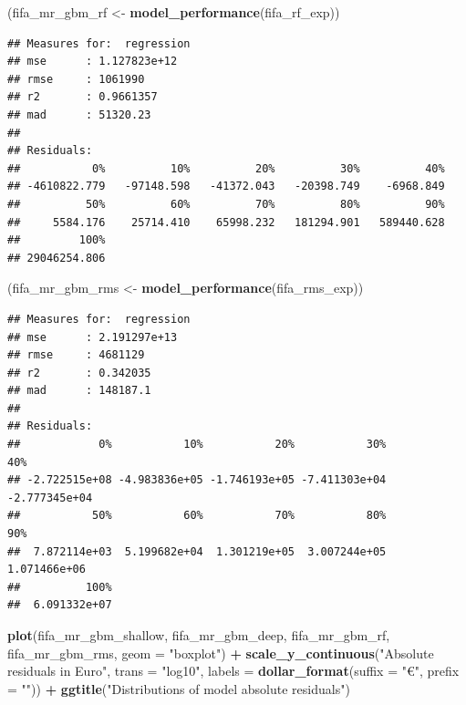 \documentclass[]{krantz}
\newenvironment{Shaded}{\begin{snugshade}}{\end{snugshade}}
\newcommand{\DataTypeTok}[1]{\textcolor[rgb]{0.13,0.29,0.53}{#1}}
\newcommand{\KeywordTok}[1]{\textcolor[rgb]{0.13,0.29,0.53}{\textbf{#1}}}
\newcommand{\NormalTok}[1]{#1}
\newcommand{\OperatorTok}[1]{\textcolor[rgb]{0.81,0.36,0.00}{\textbf{#1}}}
\newcommand{\StringTok}[1]{\textcolor[rgb]{0.31,0.60,0.02}{#1}}
\begin{document}
\begin{Shaded}
\begin{Highlighting}[]
\NormalTok{(fifa_mr_gbm_rf <-}\StringTok{ }\KeywordTok{model_performance}\NormalTok{(fifa_rf_exp))}
\end{Highlighting}
\end{Shaded}

\begin{verbatim}
## Measures for:  regression
## mse      : 1.127823e+12 
## rmse     : 1061990 
## r2       : 0.9661357 
## mad      : 51320.23
## 
## Residuals:
##           0%          10%          20%          30%          40% 
## -4610822.779   -97148.598   -41372.043   -20398.749    -6968.849 
##          50%          60%          70%          80%          90% 
##     5584.176    25714.410    65998.232   181294.901   589440.628 
##         100% 
## 29046254.806
\end{verbatim}

\begin{Shaded}
\begin{Highlighting}[]
\NormalTok{(fifa_mr_gbm_rms <-}\StringTok{ }\KeywordTok{model_performance}\NormalTok{(fifa_rms_exp))}
\end{Highlighting}
\end{Shaded}

\begin{verbatim}
## Measures for:  regression
## mse      : 2.191297e+13 
## rmse     : 4681129 
## r2       : 0.342035 
## mad      : 148187.1
## 
## Residuals:
##            0%           10%           20%           30%           40% 
## -2.722515e+08 -4.983836e+05 -1.746193e+05 -7.411303e+04 -2.777345e+04 
##           50%           60%           70%           80%           90% 
##  7.872114e+03  5.199682e+04  1.301219e+05  3.007244e+05  1.071466e+06 
##          100% 
##  6.091332e+07
\end{verbatim}

\begin{Shaded}
\begin{Highlighting}[]
\KeywordTok{plot}\NormalTok{(fifa_mr_gbm_shallow, fifa_mr_gbm_deep, fifa_mr_gbm_rf, fifa_mr_gbm_rms, }\DataTypeTok{geom =} \StringTok{"boxplot"}\NormalTok{) }\OperatorTok{+}
\StringTok{  }\KeywordTok{scale_y_continuous}\NormalTok{(}\StringTok{"Absolute residuals in Euro"}\NormalTok{, }\DataTypeTok{trans =} \StringTok{"log10"}\NormalTok{, }\DataTypeTok{labels =} \KeywordTok{dollar_format}\NormalTok{(}\DataTypeTok{suffix =} \StringTok{"€"}\NormalTok{, }\DataTypeTok{prefix =} \StringTok{""}\NormalTok{)) }\OperatorTok{+}\StringTok{ }
\StringTok{  }\KeywordTok{ggtitle}\NormalTok{(}\StringTok{"Distributions of model absolute residuals"}\NormalTok{)}
\end{Highlighting}
\end{Shaded}
\end{document}
